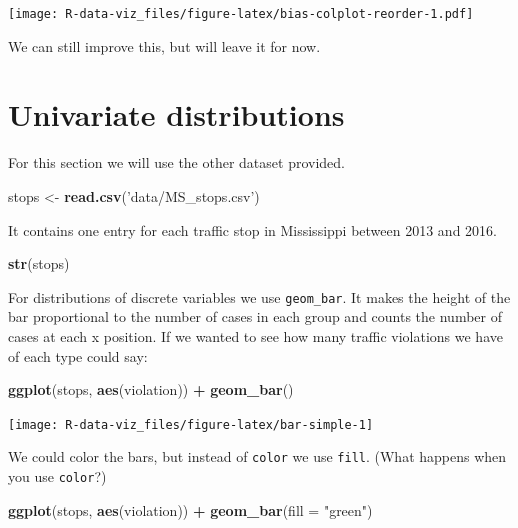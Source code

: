 \documentclass[]{book}
\newenvironment{Shaded}{\begin{snugshade}}{\end{snugshade}}
\newcommand{\KeywordTok}[1]{\textcolor[rgb]{0.13,0.29,0.53}{\textbf{#1}}}
\newcommand{\DataTypeTok}[1]{\textcolor[rgb]{0.13,0.29,0.53}{#1}}
\newcommand{\StringTok}[1]{\textcolor[rgb]{0.31,0.60,0.02}{#1}}
\newcommand{\OperatorTok}[1]{\textcolor[rgb]{0.81,0.36,0.00}{\textbf{#1}}}
\newcommand{\NormalTok}[1]{#1}
\theoremstyle{definition}
\theoremstyle{definition}
\theoremstyle{definition}
\theoremstyle{remark}
\begin{document}
\texttt{[image: R-data-viz\_files/figure-latex/bias-colplot-reorder-1.pdf]}

We can still improve this, but will leave it for now.

\section{Univariate distributions}\label{univariate-distributions}

For this section we will use the other dataset provided.

\begin{Shaded}
\begin{Highlighting}[]
\NormalTok{stops <-}\StringTok{ }\KeywordTok{read.csv}\NormalTok{(}\StringTok{'data/MS_stops.csv'}\NormalTok{)}
\end{Highlighting}
\end{Shaded}

It contains one entry for each traffic stop in Mississippi between 2013
and 2016.

\begin{Shaded}
\begin{Highlighting}[]
\KeywordTok{str}\NormalTok{(stops)}
\end{Highlighting}
\end{Shaded}

For distributions of discrete variables we use \texttt{geom\_bar}. It
makes the height of the bar proportional to the number of cases in each
group and counts the number of cases at each x position. If we wanted to
see how many traffic violations we have of each type could say:

\begin{Shaded}
\begin{Highlighting}[]
\KeywordTok{ggplot}\NormalTok{(stops, }\KeywordTok{aes}\NormalTok{(violation)) }\OperatorTok{+}\StringTok{ }
\StringTok{  }\KeywordTok{geom_bar}\NormalTok{()}
\end{Highlighting}
\end{Shaded}

\texttt{[image: R-data-viz\_files/figure-latex/bar-simple-1]}

We could color the bars, but instead of \texttt{color} we use
\texttt{fill}. (What happens when you use \texttt{color}?)

\begin{Shaded}
\begin{Highlighting}[]
\KeywordTok{ggplot}\NormalTok{(stops, }\KeywordTok{aes}\NormalTok{(violation)) }\OperatorTok{+}\StringTok{ }
\StringTok{  }\KeywordTok{geom_bar}\NormalTok{(}\DataTypeTok{fill =} \StringTok{"green"}\NormalTok{)}
\end{Highlighting}
\end{Shaded}
\end{document}
